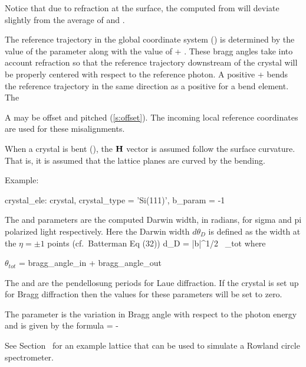 Notice that due to refraction at the surface, the computed
 from  will deviate slightly from the
average of  and .

The reference trajectory in the global coordinate system
() is determined by the value of the 
parameter along with the value of  +
. These bragg angles take into account refraction
so that the reference trajectory downstream of the crystal will be
properly centered with respect to the reference photon. A positive
 +  bends the reference
trajectory in the same direction as a positive  for a bend
element. The

A  may be offset and pitched (\ref{s:offset}). The incoming
local reference coordinates are used for these misalignments. 

When a crystal is bent (), the ${\bf H}$ vector is
assumed follow the surface curvature. That is, it is assumed that the
lattice planes are curved by the bending.

Example:
\begin{example}
  crystal_ele: crystal, crystal_type = 'Si(111)', b_param = -1
\end{example}

The  and  parameters are
the computed Darwin width, in radians, for sigma and pi polarized
light respectively. Here the Darwin width $d\theta_D$ is defined as
the width at the $\eta = \pm 1$ points
(cf.~Batterman\cite{b:batterman} Eq (32))
\Begineq
  d\theta_D = 
                 {|b|^{1/2} \, \sin\theta_{tot}}
\Endeq
where
\begin{example}
  \(\theta_{tot}\) = bragg_angle_in + bragg_angle_out 
\end{example}

The  and  are
the pendellosung periods for Laue diffraction. If the crystal is set up for
Bragg diffraction then the values for these parameters will be set to zero.

The  parameter is the variation in Bragg angle
with respect to the photon energy and is given by the formula
\Begineq
   = -
\Endeq

See Section~ for an example lattice that can be used to simulate
a Rowland circle spectrometer.

